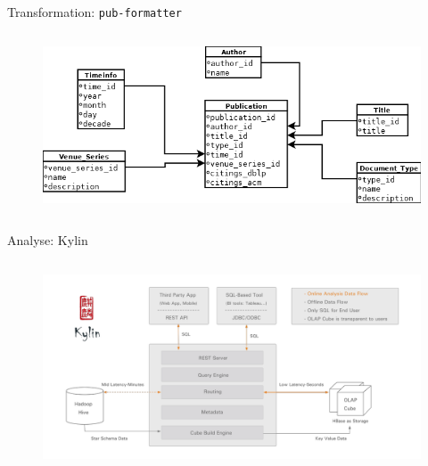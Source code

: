 \documentclass[12pt, utf8, ngerman, notes]{beamer}
\begin{document}
\begin{frame}{Transformation: \texttt{pub-formatter}}
\begin{columns}
      \column{\dimexpr\paperwidth}
      \begin{figure}[H]
          \begin{center}
              \includegraphics[width=\paperwidth]{pics/Star-Schema-final.png}
          \end{center}
      \end{figure}
	\end{columns}
\end{frame}

\begin{frame}{Analyse: Kylin}
	\begin{columns}
      \column{\dimexpr\paperwidth}
      \begin{figure}[H]
          \begin{center}
              \includegraphics[width=\paperwidth]{pics/kylin_diagram.png}
          \end{center}
      \end{figure}
	\end{columns}
\end{frame}
\end{document}
